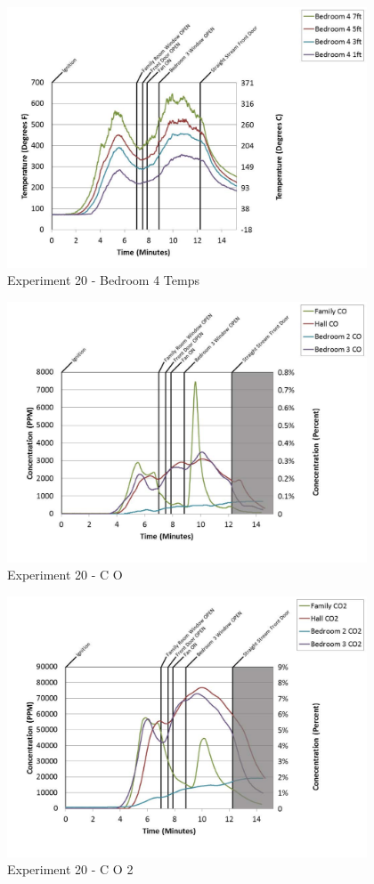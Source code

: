 \documentclass{article}
\begin{document}
\begin{appendices}
	\clearpage

	\begin{figure}[h!]
		\centering
		\includegraphics[height=3.05in]{0_Images/Results_Charts/Exp_20_Charts/Bedroom4Temps.pdf}
		\caption{Experiment 20 - Bedroom 4 Temps}
	\end{figure}
 

	\begin{figure}[h!]
		\centering
		\includegraphics[height=3.05in]{0_Images/Results_Charts/Exp_20_Charts/CO.pdf}
		\caption{Experiment 20 - C O}
	\end{figure}
 
	\clearpage

	\begin{figure}[h!]
		\centering
		\includegraphics[height=3.05in]{0_Images/Results_Charts/Exp_20_Charts/CO2.pdf}
		\caption{Experiment 20 - C O 2}
	\end{figure}
 


\end{appendices}
\end{document}
